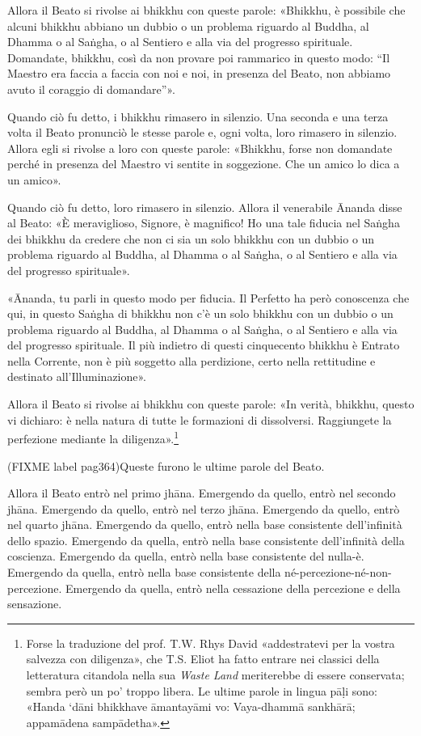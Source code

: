 

Allora il Beato si rivolse ai bhikkhu con queste parole: «Bhikkhu, è
possibile che alcuni bhikkhu abbiano un dubbio o un problema riguardo al
Buddha, al Dhamma o al Saṅgha, o al Sentiero e alla via del progresso
spirituale. Domandate, bhikkhu, così da non provare poi rammarico in
questo modo: “Il Maestro era faccia a faccia con noi e noi, in presenza
del Beato, non abbiamo avuto il coraggio di domandare”».


Quando ciò fu detto, i bhikkhu rimasero in silenzio. Una seconda e una
terza volta il Beato pronunciò le stesse parole e, ogni volta, loro
rimasero in silenzio. Allora egli si rivolse a loro con queste parole:
«Bhikkhu, forse non domandate perché in presenza del Maestro vi sentite
in soggezione. Che un amico lo dica a un amico».


Quando ciò fu detto, loro rimasero in silenzio. Allora il venerabile
Ānanda disse al Beato: «È meraviglioso, Signore, è magnifico! Ho una
tale fiducia nel Saṅgha dei bhikkhu da credere che non ci sia un solo
bhikkhu con un dubbio o un problema riguardo al Buddha, al Dhamma o al
Saṅgha, o al Sentiero e alla via del progresso spirituale».


«Ānanda, tu parli in questo modo per fiducia. Il Perfetto ha però
conoscenza che qui, in questo Saṅgha di bhikkhu non c’è un solo bhikkhu
con un dubbio o un problema riguardo al Buddha, al Dhamma o al Saṅgha, o
al Sentiero e alla via del progresso spirituale. Il più indietro di
questi cinquecento bhikkhu è Entrato nella Corrente, non è più soggetto
alla perdizione, certo nella rettitudine e destinato all’Illuminazione».


Allora il Beato si rivolse ai bhikkhu con queste parole: «In verità,
bhikkhu, questo vi dichiaro: è nella natura di tutte le formazioni di
dissolversi. Raggiungete la perfezione mediante la
diligenza».\footnote{Forse la traduzione del prof. T.W. Rhys David «addestratevi per la vostra salvezza con diligenza», che T.S. Eliot ha fatto entrare nei classici della letteratura citandola nella sua \emph{Waste Land} meriterebbe di essere conservata; sembra però un po’ troppo libera. Le ultime parole in lingua pāḷi sono: «Handa ‘dāni bhikkhave āmantayāmi vo: Vaya-dhammā sankhārā; appamādena sampādetha».}




(FIXME label pag364)Queste furono le ultime parole del Beato.


Allora il Beato entrò nel primo jhāna. Emergendo da quello, entrò nel
secondo jhāna. Emergendo da quello, entrò nel terzo jhāna. Emergendo da
quello, entrò nel quarto jhāna. Emergendo da quello, entrò nella base
consistente dell’infinità dello spazio. Emergendo da quella, entrò nella
base consistente dell’infinità della coscienza. Emergendo da quella,
entrò nella base consistente del nulla-è. Emergendo da quella, entrò
nella base consistente della né-percezione-né-non-percezione. Emergendo
da quella, entrò nella cessazione della percezione e della sensazione.


